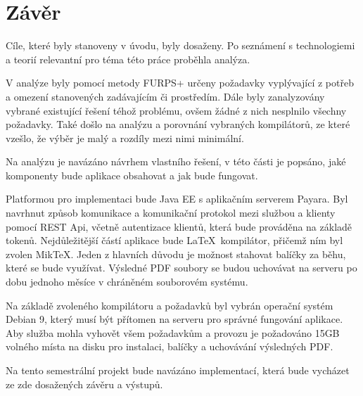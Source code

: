 \chapter{Závěr}

Cíle, které byly stanoveny v úvodu, byly dosaženy. Po seznámení s technologiemi a teorií relevantní pro téma této práce proběhla analýza. 
\par
V analýze byly pomocí metody FURPS+ určeny požadavky vyplývající z potřeb a omezení stanovených zadávajícím či prostředím. Dále byly zanalyzovány vybrané existující řešení téhož problému, ovšem žádné z nich nesplnilo všechny požadavky. Také došlo na analýzu a porovnání vybraných kompilátorů, ze které vzešlo, že výběr je malý a rozdíly mezi nimi minimální.  
\par
Na analýzu je navázáno návrhem vlastního řešení, v této části je popsáno, jaké komponenty bude aplikace obsahovat a jak bude fungovat. 
\par
Platformou pro implementaci bude Java EE s aplikačním serverem Payara. Byl navrhnut způsob komunikace a komunikační protokol mezi službou a klienty pomocí REST Api, včetně autentizace klientů, která bude prováděna na základě tokenů. Nejdůležitější částí aplikace bude \LaTeX\ kompilátor, přičemž ním byl zvolen MikTeX. Jeden z hlavních důvodu je možnost stahovat balíčky za běhu, které se bude využívat. Výsledné PDF soubory se budou uchovávat na serveru po dobu jednoho měsíce v chráněném souborovém systému. 
\par
Na základě zvoleného kompilátoru a požadavků byl vybrán operační systém Debian 9, který musí být přítomen na serveru pro správné fungování aplikace. Aby služba mohla vyhovět všem požadavkům a provozu je požadováno 15GB volného místa na disku pro instalaci, balíčky a uchovávání výsledných PDF.
\par
Na tento semestrální projekt bude navázáno implementací, která bude vycházet ze zde dosažených závěru a výstupů.
 